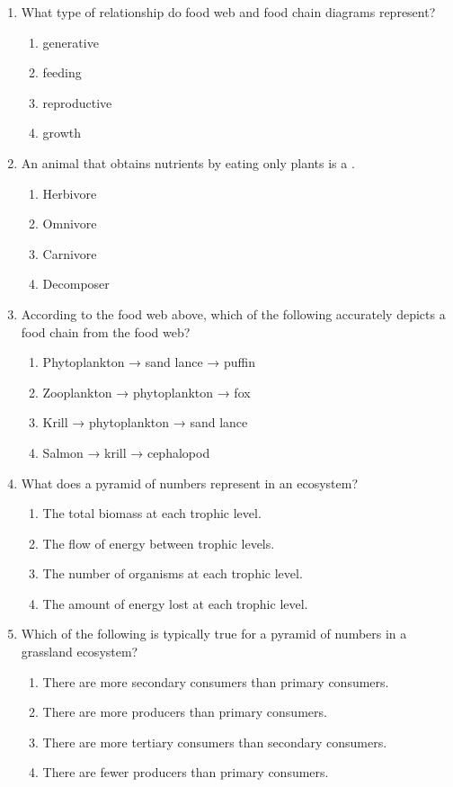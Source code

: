 \documentclass{article}
\begin{document}
\begin{enumerate}
    \item What type of relationship do food web and food chain diagrams represent?
    \begin{enumerate}
        \item generative
        \item feeding
        \item reproductive
        \item growth
    \end{enumerate}

    \item An animal that obtains nutrients by eating only plants is a \underline{\hspace{5cm}}.
    \begin{enumerate}
        \item Herbivore
        \item Omnivore
        \item Carnivore
        \item Decomposer
    \end{enumerate}

    \item According to the food web above, which of the following accurately depicts a food chain from the food web?
    \begin{enumerate}
        \item Phytoplankton → sand lance → puffin
        \item Zooplankton → phytoplankton → fox
        \item Krill → phytoplankton → sand lance
        \item Salmon → krill → cephalopod
    \end{enumerate}

    \item What does a pyramid of numbers represent in an ecosystem?
    \begin{enumerate}
        \item The total biomass at each trophic level.
        \item The flow of energy between trophic levels.
        \item The number of organisms at each trophic level.
        \item The amount of energy lost at each trophic level.
    \end{enumerate}

    \item Which of the following is typically true for a pyramid of numbers in a grassland ecosystem?
    \begin{enumerate}
        \item There are more secondary consumers than primary consumers.
        \item There are more producers than primary consumers.
        \item There are more tertiary consumers than secondary consumers.
        \item There are fewer producers than primary consumers.
    \end{enumerate}


\end{enumerate}
\end{document}
